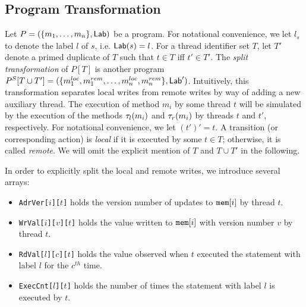 \subsection{Program Transformation}
\label{subsec:program-transformation}
Let $P=(\{m_1,\ldots,m_n\},\mathsf{Lab})$ be a program.
For notational convenience, we let $l_s$ to denote the label $l$ of $s$, i.e. $\mathsf{Lab}(s)=l$.
For a thread identifier set $T$, let $T'$ denote a primed duplicate of $T$ such that $t\in T$ iff $t'\in T'$.
The {\em split transformation} of $P[T]$ is another program $P^S[T\cup T']=(\{m^{loc}_1,m^{rem}_1,\ldots,m^{loc}_n,m^{rem}_n\},\mathsf{Lab}')$.
Intuitively, this transformation separates local writes from remote writes by way of adding a new auxiliary thread.
The execution of method $m_i$ by some thread $t$ will be simulated by the execution of the methods $\tau_{l}(m_i)$ and $\tau_{r}(m_i)$ by threads $t$ and $t'$, respectively.
For notational convenience, we let $(t')'=t$.
A transition (or corresponding action) is {\em local} if it is executed by some $t\in T$; otherwise, it is called {\em remote}.
We will omit the explicit mention of $T$ and $T\cup T'$ in the following.

In order to explicitly split the local and remote writes, we introduce several arrays:
\begin{itemize}
\item {\tt AdrVer[$i$][$t$]} holds the version number of updates to $\mathtt{mem}[i]$ by thread $t$.
\item {\tt WrVal[$i$][$v$][$t$]} holds the value written to $\mathtt{mem}[i]$ with version number $v$ by thread $t$.
\item {\tt RdVal[$l$][$c$][$t$]} holds the value observed when $t$ executed the statement with label $l$ for the $c^{th}$ time.
\item {\tt ExecCnt[$l$][$t$]} holds the number of times the statement with label $l$ is executed by $t$.
\end{itemize}

